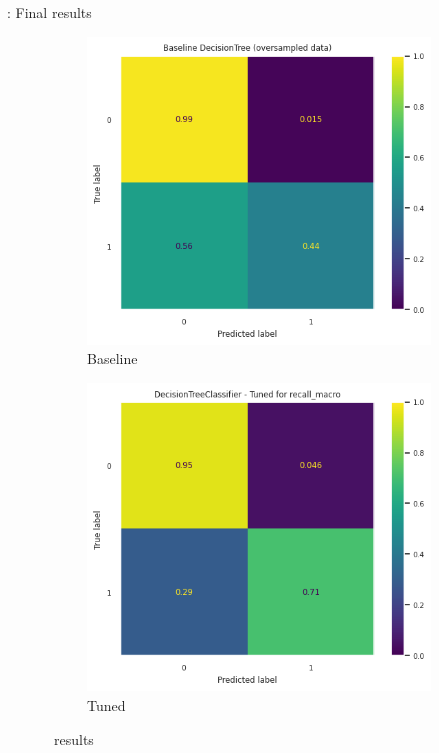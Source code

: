 \begin{frame}{\subsecname : Final results}
\begin{figure}
    \centering
    \begin{subfigure}[c]{0.4\textwidth}
        \includegraphics[width=\textwidth]{images/models/DT_base_overs.png}
        \caption{Baseline}
        \label{fig:DT_baseline}
    \end{subfigure}
    \begin{subfigure}[c]{0.4\textwidth}
        \includegraphics[width=\textwidth]{images/models/DT_recmacro.png}
        \caption{Tuned}
        \label{fig:DT_tuned}
    \end{subfigure}
    \caption{\subsecname\ results}
    \label{fig:DT_results}
\end{figure}
\end{frame}

